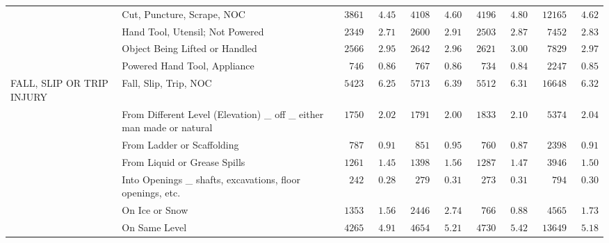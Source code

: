 \documentclass[9pt, oneside]{article}   	%
\begin{document}
\begin{longtable}{p{1.8in}p{2.2in}cccccccc}
 & Cut, Puncture, Scrape, NOC  & $\phantom{0}3861$ & $\phantom{0}4.45$ & $\phantom{0}4108$ & $\phantom{0}4.60$ & $\phantom{0}4196$ & $\phantom{0}4.80$ & $\phantom{0}12165$ & $\phantom{0}4.62$ \\
 & Hand Tool, Utensil; Not Powered  & $\phantom{0}2349$ & $\phantom{0}2.71$ & $\phantom{0}2600$ & $\phantom{0}2.91$ & $\phantom{0}2503$ & $\phantom{0}2.87$ & $\phantom{00}7452$ & $\phantom{0}2.83$ \\
 & Object Being Lifted or Handled  & $\phantom{0}2566$ & $\phantom{0}2.95$ & $\phantom{0}2642$ & $\phantom{0}2.96$ & $\phantom{0}2621$ & $\phantom{0}3.00$ & $\phantom{00}7829$ & $\phantom{0}2.97$ \\
 & Powered Hand Tool, Appliance  & $\phantom{00}746$ & $\phantom{0}0.86$ & $\phantom{00}767$ & $\phantom{0}0.86$ & $\phantom{00}734$ & $\phantom{0}0.84$ & $\phantom{00}2247$ & $\phantom{0}0.85$ \\
FALL, SLIP OR TRIP INJURY & Fall, Slip, Trip, NOC  & $\phantom{0}5423$ & $\phantom{0}6.25$ & $\phantom{0}5713$ & $\phantom{0}6.39$ & $\phantom{0}5512$ & $\phantom{0}6.31$ & $\phantom{0}16648$ & $\phantom{0}6.32$ \\
 & From Different Level (Elevation) \_ off \_ either man made or natural  & $\phantom{0}1750$ & $\phantom{0}2.02$ & $\phantom{0}1791$ & $\phantom{0}2.00$ & $\phantom{0}1833$ & $\phantom{0}2.10$ & $\phantom{00}5374$ & $\phantom{0}2.04$ \\
 & From Ladder or Scaffolding  & $\phantom{00}787$ & $\phantom{0}0.91$ & $\phantom{00}851$ & $\phantom{0}0.95$ & $\phantom{00}760$ & $\phantom{0}0.87$ & $\phantom{00}2398$ & $\phantom{0}0.91$ \\
 & From Liquid or Grease Spills  & $\phantom{0}1261$ & $\phantom{0}1.45$ & $\phantom{0}1398$ & $\phantom{0}1.56$ & $\phantom{0}1287$ & $\phantom{0}1.47$ & $\phantom{00}3946$ & $\phantom{0}1.50$ \\
 & Into Openings \_ shafts, excavations, floor openings, etc.  & $\phantom{00}242$ & $\phantom{0}0.28$ & $\phantom{00}279$ & $\phantom{0}0.31$ & $\phantom{00}273$ & $\phantom{0}0.31$ & $\phantom{000}794$ & $\phantom{0}0.30$ \\
 & On Ice or Snow  & $\phantom{0}1353$ & $\phantom{0}1.56$ & $\phantom{0}2446$ & $\phantom{0}2.74$ & $\phantom{00}766$ & $\phantom{0}0.88$ & $\phantom{00}4565$ & $\phantom{0}1.73$ \\
 & On Same Level  & $\phantom{0}4265$ & $\phantom{0}4.91$ & $\phantom{0}4654$ & $\phantom{0}5.21$ & $\phantom{0}4730$ & $\phantom{0}5.42$ & $\phantom{0}13649$ & $\phantom{0}5.18$ \\

\end{longtable}
\end{document}
